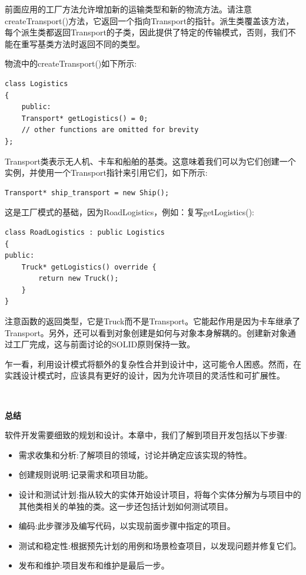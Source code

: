 前面应用的工厂方法允许增加新的运输类型和新的物流方法。请注意createTransport()方法，它返回一个指向Transport的指针。派生类覆盖该方法，每个派生类都返回Transport的子类，因此提供了特定的传输模式，否则，我们不能在重写基类方法时返回不同的类型。 \par
物流中的createTransport()如下所示: \par

\begin{lstlisting}[caption={}]
class Logistics
{
	public:
	Transport* getLogistics() = 0;
	// other functions are omitted for brevity
};
\end{lstlisting}

Transport类表示无人机、卡车和船舶的基类。这意味着我们可以为它们创建一个实例，并使用一个Transport指针来引用它们，如下所示: \par

\begin{lstlisting}[caption={}]
Transport* ship_transport = new Ship();
\end{lstlisting}

这是工厂模式的基础，因为RoadLogistics，例如：复写getLogistics(): \par

\begin{lstlisting}[caption={}]
class RoadLogistics : public Logistics
{
public:
	Truck* getLogistics() override {
		return new Truck();
	}
}
\end{lstlisting}

注意函数的返回类型，它是Truck而不是Transport。它能起作用是因为卡车继承了Transport。另外，还可以看到对象创建是如何与对象本身解耦的。创建新对象通过工厂完成，这与前面讨论的SOLID原则保持一致。 \par
乍一看，利用设计模式将额外的复杂性合并到设计中，这可能令人困惑。然而，在实践设计模式时，应该具有更好的设计，因为允许项目的灵活性和可扩展性。 \par

\noindent\textbf{}\ \par
\textbf{总结} \ \par
软件开发需要细致的规划和设计。本章中，我们了解到项目开发包括以下步骤: \par

\begin{itemize}
	\item 需求收集和分析:了解项目的领域，讨论并确定应该实现的特性。
	\item 创建规则说明:记录需求和项目功能。
	\item 设计和测试计划:指从较大的实体开始设计项目，将每个实体分解为与项目中的其他类相关的单独的类。这一步还包括计划如何测试项目。
	\item 编码:此步骤涉及编写代码，以实现前面步骤中指定的项目。
	\item 测试和稳定性:根据预先计划的用例和场景检查项目，以发现问题并修复它们。
	\item 发布和维护:项目发布和维护是最后一步。
\end{itemize}

